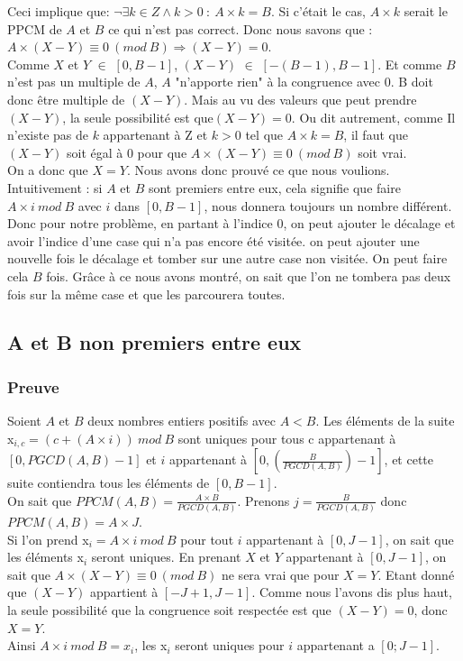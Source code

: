 Ceci implique que: $\neg  \exists k \in Z \wedge k>0\ :\ A\times k = B$. Si c'était le cas, $A\times k$ serait le PPCM de $A$ et $B$ ce qui n'est pas correct. Donc nous savons que : $A\times (X-Y) ≡ 0\ (mod\ B) \Rightarrow (X-Y) = 0$.\\

Comme $X$ et $Y$ $\in$ $[0, B-1]$, $(X-Y)$ $\in$ $[-(B-1),B-1]$. Et comme $B$ n'est pas un multiple de $A$, $A$ "n'apporte rien" à la congruence avec 0. B doit donc être multiple de $(X-Y)$. Mais au vu des valeurs que peut prendre $(X-Y)$, la seule possibilité est que$(X-Y) = 0$. Ou dit autrement, comme  Il n'existe pas de $k$ appartenant à Z et $k > 0$ tel que $A\times k = B$, il faut que $(X-Y)$ soit égal à 0 pour que $A\times (X-Y) ≡ 0\ (mod\ B)$ soit vrai. \\
On a donc que $X = Y$. Nous avons donc prouvé ce que nous voulions. \\

Intuitivement : si $A$ et $B$ sont premiers entre eux, cela signifie que faire $A\times i\ mod\ B$ avec $i$ dans $[0, B-1]$, nous donnera toujours un nombre différent. Donc pour notre problème, en partant à l'indice 0, on peut ajouter le décalage et avoir l'indice d'une case qui n'a pas encore été visitée. on peut ajouter une nouvelle fois le décalage et tomber sur une autre case non visitée. On peut faire cela $B$ fois. Grâce à ce nous avons montré, on sait que l'on ne tombera pas deux fois sur la même case et que les parcourera toutes. 

\subsection*{A et B non premiers entre eux}
\subsubsection*{Preuve}
Soient $A$ et $B$ deux nombres entiers positifs avec $A < B$. Les éléments de la suite x$_{i,c} = (c + (A\times i))\ mod\ B$ sont uniques pour tous c appartenant à $[0, PGCD(A,B)-1]$ et $i$ appartenant à $[0, (\frac{B}{PGCD(A,B)})-1]$, et cette suite contiendra tous les éléments de $[0, B-1]$. \\

On sait que $PPCM(A,B) = \frac{A\times B}{PGCD(A,B)}$. Prenons $j = \frac{B}{PGCD(A,B)}$ donc $PPCM(A,B) = A\times J$.\\

Si l'on prend x$_{i} = A\times i\ mod\ B$ pour tout $i$ appartenant à $[0, J-1]$, on sait que les éléments x$_{i}$ seront uniques. En prenant $X$ et $Y$ appartenant à $[0, J-1]$, on sait que $A\times (X-Y) ≡ 0\ (mod\ B)$ ne sera vrai que pour $X=Y$. Etant donné que $(X-Y)$ appartient à $[-J+1, J-1]$. Comme nous l'avons dis plus haut, la seule possibilité que la congruence soit respectée est que $(X-Y) = 0$, donc $X=Y$. \\
Ainsi $A\times i\ mod\ B = x_{i}$, les x$_{i}$ seront uniques pour $i$ appartenant a $[0; J-1]$.\\

